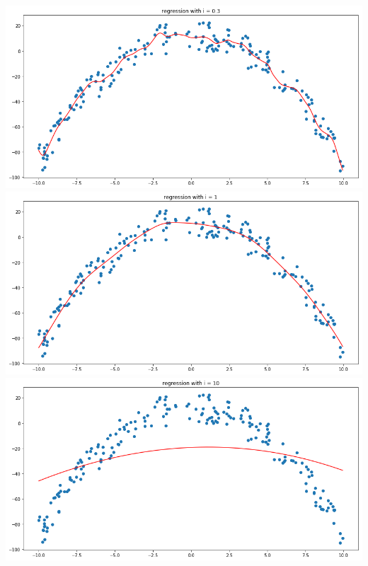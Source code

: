 \includegraphics[width=\linewidth]{4b1.png}\\
\includegraphics[width=\linewidth]{4b2.png}\\
\includegraphics[width=\linewidth]{4b3.png}\\